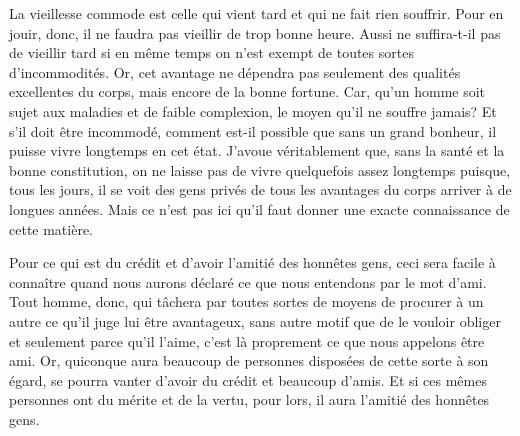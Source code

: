 La vieillesse commode est celle qui vient tard et qui ne fait rien souffrir. Pour en jouir, donc, il ne faudra pas vieillir
de trop bonne heure. Aussi ne suffira-t-il pas de vieillir tard si en même temps on n'est exempt de toutes sortes
d'incommodités. Or, cet avantage ne dépendra pas seulement des qualités excellentes du corps, mais encore de la bonne
fortune. Car, qu'un homme soit sujet aux maladies et de faible complexion, le moyen qu'il ne souffre jamais? Et s'il doit
être incommodé, comment est-il possible que sans un grand bonheur, il puisse vivre longtemps en cet état. J'avoue
véritablement que, sans la santé et la bonne constitution, on ne laisse pas de vivre quelquefois assez longtemps puisque,
tous les jours, il se voit des gens privés de tous les avantages du corps arriver à de longues années. Mais ce n'est pas
ici qu'il faut donner une exacte connaissance de cette matière.

\bigbreak

Pour ce qui est du crédit et d'avoir l'amitié des honnêtes gens, ceci sera facile à connaître quand nous aurons déclaré ce
que nous entendons par le mot d'ami. Tout homme, donc, qui tâchera par toutes sortes de moyens de procurer à un autre ce
qu'il juge lui être avantageux, sans autre motif que de le vouloir obliger et seulement parce qu'il l'aime, c'est là
proprement ce que nous appelons être ami. Or, quiconque aura beaucoup de personnes disposées de cette sorte à son égard,
se pourra vanter d'avoir du crédit et beaucoup d'amis. Et si ces mêmes personnes ont du mérite et de la vertu, pour lors,
il aura l'amitié des honnêtes gens.

\bigbreak

